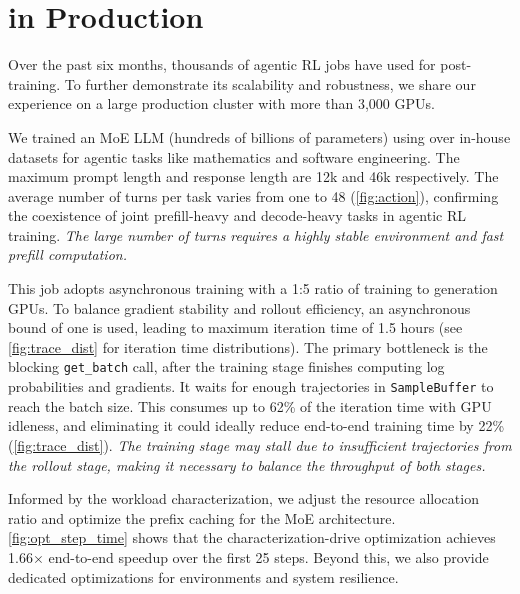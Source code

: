 
\section{\SystemName{} in Production}
\label{sec:large-scale-analysis}



Over the past six months, thousands of agentic RL jobs have used \SystemName{} for post-training. 
To further demonstrate its scalability and robustness, we share our
experience on a large production cluster with more than 3,000 GPUs. 




We trained an MoE LLM (hundreds of billions of parameters) using \SystemName{} over in-house datasets for agentic tasks like mathematics and software engineering. 
The maximum prompt length and response length are 12k and 46k respectively. 
The average number of turns per task varies from one to 48 (\autoref{fig:action}), confirming the coexistence of joint prefill-heavy and decode-heavy tasks in agentic RL training. 
\emph{The large number of turns requires a highly stable environment and fast prefill computation.}



This job adopts asynchronous training with a 1:5 ratio of training to generation GPUs. 
To balance gradient stability and rollout efficiency, an asynchronous bound of one is used, leading to maximum iteration time of 1.5 hours (see \autoref{fig:trace_dist} for iteration time distributions). 
The primary bottleneck is the blocking \texttt{get\_batch} call, after the training stage finishes computing log probabilities and gradients.
It waits for enough trajectories in \texttt{SampleBuffer} to reach the batch size. 
This consumes up to 62\% of the iteration time with GPU idleness, and eliminating it could ideally reduce end-to-end training time by 22\% (\autoref{fig:trace_dist}). \emph{The training stage may stall due to insufficient trajectories from the rollout stage, making it necessary to balance the throughput of both stages.}



Informed by the workload characterization, we adjust the resource allocation ratio and optimize the prefix caching for the MoE architecture. \autoref{fig:opt_step_time} shows that the characterization-drive optimization achieves 1.66$\times$ end-to-end speedup over the first 25 steps. Beyond this, we also provide dedicated optimizations for environments and system resilience. 




